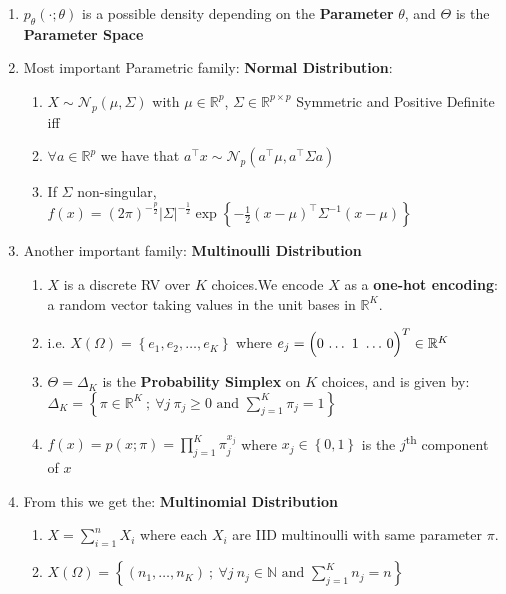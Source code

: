 \documentclass[a4paper,portrait,columns=2, hidelinks]{cheatsheet}
\begin{document}
\begin{enumerate}
	\item  $p_\theta (\cdot ; \theta)$ is a possible density depending on the \textbf{Parameter} $ \theta $, and $\Theta $ is the \textbf{Parameter Space}
	\item Most important Parametric family: \textbf{Normal Distribution}:
	\begin{enumerate}
		\item \(X \sim \mathcal{N}_p(\mu, \Sigma)\) with \(\mu\in\mathbb{R}^p\), \(\Sigma \in \mathbb{R}^{p \times p}\) Symmetric and Positive Definite iff
		\item  \(\forall a \in \mathbb{R}^p\) we have that \(a^\intercal x \sim \mathcal{N}_p(a^\intercal\mu, a^\intercal\Sigma a)\)
		\item If \(\Sigma\) non-singular, \(f(x)={(2\pi)}^{-\frac{p}{2}}|\Sigma|^{-\frac{1}{2}}\exp{ \left\{-\frac{1}{2}(x-\mu)^\intercal\Sigma^{-1}(x-\mu) \right\} } \)
	\end{enumerate}
	\item Another important family: \textbf{Multinoulli Distribution}
	\begin{enumerate}
		\item $X$ is a discrete RV over $K$ choices.We encode $X$ as a \textbf{one-hot encoding}: a random vector taking values in the unit bases in $\mathbb{R}^{K}$.
		
		\item i.e. \(X(\Omega) = \left\{e_{1}, e_{2}, \ldots, e_{K}\right\}\) where \(e_{j} = \left(0\,\ldots\tikz[remember picture,baseline]{\node[anchor=base] (one-hot-1) {$1$};}\ldots\,0\right)^{T} \in \mathbb{R}^{K}\)
		
		\hfill
		
		\item  $\Theta = \Delta_{K}$ is the \textbf{Probability Simplex} on $K$ choices, and is given by: \(\Delta_{K} = \left\{\pi \in \mathbb{R}^{K}\ ;\ \forall j\ \pi_{j} \geq 0 \text{ and } \sum_{j=1}^{K}\pi_{j} = 1\right\}\)
		\item \(f(x) = p(x;\pi) = \prod_{j=1}^{K}\pi_{j}^{x_{j}}\) where \(x_{j} \in \left\{0,1\right\}\) is the $j$\textsuperscript{th} component of $x$
	\end{enumerate}
	\item From this we get the: \textbf{Multinomial Distribution}
	\begin{enumerate}
		\item \(X = \sum_{i=1}^{n}X_{i}\) where each \(X_i\) are IID multinoulli with same parameter \(\pi\).
		\item \(X(\Omega) = \left\{(n_{1},\ldots,n_{K})\ ;\ \forall j\ n_{j} \in \mathbb{N} \text{ and } \sum_{j=1}^{K}n_{j} = n\right\}\)
	\end{enumerate}
\end{enumerate}
\end{document}
